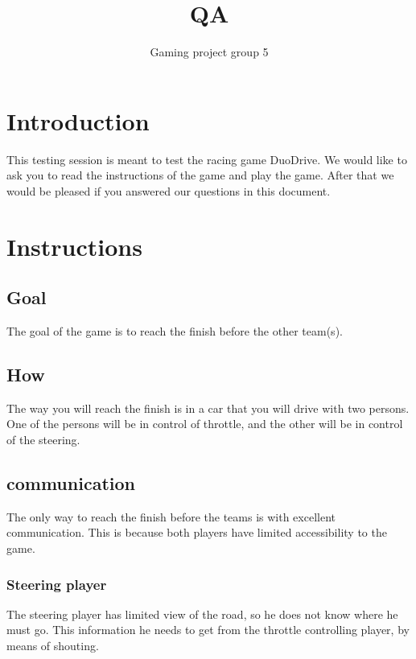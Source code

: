 \documentclass{article}
\title{QA}
\author{Gaming project group 5}
\date{}
\newcounter{question}
\begin{document}
\newcommand\Que[1]{%
   \leavevmode\par
   \stepcounter{question}
   \noindent
   \thequestion. Q --- #1\par}

\newcommand\Ans[2][]{%
    \leavevmode\par\noindent
   {\leftskip37pt
    A --- \textbf{#1}#2\par}}


\maketitle

\section{Introduction}
This testing session is meant to test the racing game DuoDrive. We would like to ask you to read the instructions of the game and play the game. After that we would be pleased if you answered our questions in this document.

\section{Instructions}
\subsection{Goal}
The goal of the game is to reach the finish before the other team(s). 
\subsection{How}
The way you will reach the finish is in a car that you will drive with two persons. One of the persons will be in control of throttle, and the other will be in control of the steering. 
\subsection{communication}
The only way to reach the finish before the teams is with excellent communication. This is because both players have limited accessibility to the game. 
\subsubsection{Steering player}
The steering player has limited view of the road, so he does not know where he must go. This information he needs to get from the throttle controlling player, by means of shouting.
\end{document}
